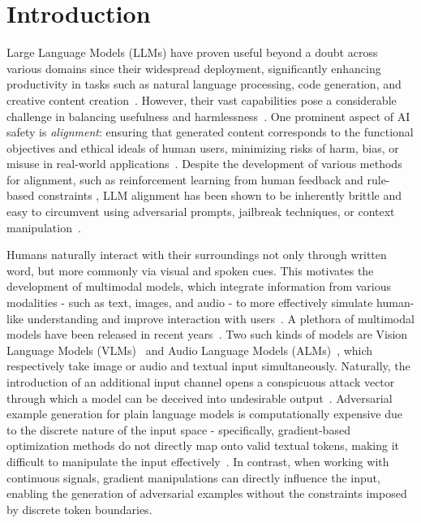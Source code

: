 \section{Introduction}

Large Language Models (LLMs) have proven useful beyond a doubt across various domains since their widespread deployment, significantly enhancing productivity in tasks such as natural language processing, code generation, and creative content creation~\citep{brown2020languagemodelsfewshotlearners, openai2024}. 
However, their vast capabilities pose a considerable challenge in balancing usefulness and harmlessness~\citep{bommasani2022opportunitiesrisksfoundationmodels}. 
One prominent aspect of AI safety is \textit{alignment}: ensuring that generated content corresponds to the functional objectives and ethical ideals of human users, minimizing risks of harm, bias, or misuse in real-world applications~\citep{weidinger2021ethicalsocialrisksharm, russelaicontrol}. 
Despite the development of various methods for alignment, such as reinforcement learning from human feedback \cite{rlhf} and rule-based constraints \cite{mu2024rulebasedrewardslanguage}, LLM alignment has been shown to be inherently brittle and easy to circumvent using adversarial prompts, jailbreak techniques, or context manipulation~\citep{perez2022redteaminglanguagemodels, liu2024autodangeneratingstealthyjailbreak, wei2023jailbrokendoesllmsafety,xu2024comprehensivestudyjailbreakattack}. 

Humans naturally interact with their surroundings not only through written word, but more commonly via visual and spoken cues. This motivates the development of multimodal models, which integrate information from various modalities - such as text, images, and audio - to more effectively simulate human-like understanding and improve interaction with users~\citep{multimodality}. A plethora of multimodal models have been released in recent years~\citep{alayrac2022flamingovisuallanguagemodel, liu2023visualinstructiontuning, driess2023palmeembodiedmultimodallanguage}. Two such kinds of models are Vision Language Models (VLMs)~\citep{vlms} and Audio Language Models (ALMs)~\citep{chu2023qwenaudioadvancinguniversalaudio}, which respectively take image or audio and textual input simultaneously. Naturally, the introduction of an additional input channel opens a conspicuous attack vector through which a model can be deceived into undesirable output~\citep{eykholt2018physicaladversarialexamplesobject, roboticarmadversarial}. Adversarial example generation for plain language models is computationally expensive due to the discrete nature of the input space - specifically, gradient-based optimization methods do not directly map onto valid textual tokens, making it difficult to manipulate the input effectively~\citep{carlini2018audioadversarialexamplestargeted}. In contrast, when working with continuous signals, gradient manipulations can directly influence the input, enabling the generation of adversarial examples without the constraints imposed by discrete token boundaries.

